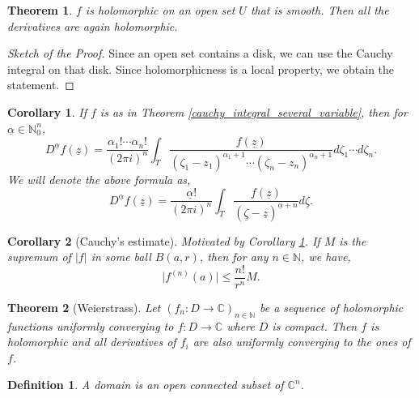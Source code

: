 \documentclass{article}
\newtheorem{theorem}{Theorem} [section]
\newtheorem{definition}{Definition}[section]
\newtheorem{corollary}{Corollary} [section]
\newcommand{\N}[0]{\mathbb{N}}
\newcommand{\C}[0]{\mathbb{C}}
\begin{document}
\begin{theorem}
$f$ is holomorphic on an open set $U$ that is smooth. Then all the derivatives are again holomorphic. 
\end{theorem}

\begin{proof}[Sketch of the Proof]
Since an open set contains a disk, we can use the Cauchy integral on that disk. Since holomorphicness is a local property, we obtain the statement.
\end{proof}

\begin{corollary}
If $f$ is as in Theorem \ref{cauchy_integral_several_variable}, then for $\underline{\alpha}\in\N_0^n$,
\begin{equation*}
D^{\underline{\alpha}} f(\underline{z}) = {\frac {\alpha_1!\cdots\alpha_n!} {(2\pi i)^n}}\int_T{\frac {f(\underline{z})} {(\zeta_1-z_1)^{\alpha_1+1}\cdots(\zeta_n-z_n)^{\alpha_n+1}}}d\zeta_1\cdots d\zeta_n.
\end{equation*}
We will denote the above formula as,
\begin{equation*}
D^{\underline{\alpha}} f(\underline{z}) = {\frac {\underline{\alpha}!} {(2\pi i)^n}}\int_T{\frac {f(\underline{z})} {(\underline{\zeta}-\underline{z})^{\underline{\alpha}+n}}}d\underline{\zeta}.
\end{equation*}
\label{corollary_cauchy_derivative}
\end{corollary}

\begin{corollary}[Cauchy's estimate]
  Motivated by Corollary \ref{corollary_cauchy_derivative}. If $M$ is the supremum of $\vert f\vert$ in some ball $B(a,r)$, then for any $n\in\N$, we have,
  \begin{equation*}
    \vert f^{(n)}(a)\vert\leq {\frac {n!} {r^n}}M.
  \end{equation*}
  \label{corollary_cauchy_estimate}
\end{corollary}

\begin{theorem}[Weierstrass]
Let $(f_n:D\to\C)_{n\in\N}$ be a sequence of holomorphic functions uniformly converging to $f:D\to\C$ where $D$ is compact. Then $f$ is holomorphic and all derivatives of $f_i$ are also uniformly converging to the ones of $f$.
\end{theorem}

\begin{definition}
A domain is an open connected subset of $\C^n$.
\end{definition}
\end{document}
